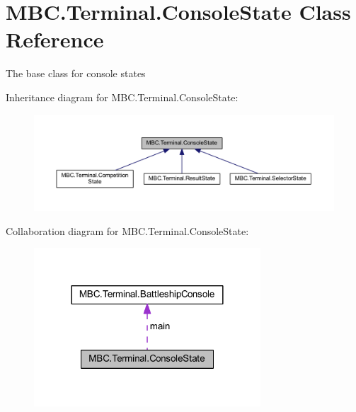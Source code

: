 \hypertarget{class_m_b_c_1_1_terminal_1_1_console_state}{\section{M\-B\-C.\-Terminal.\-Console\-State Class Reference}
\label{class_m_b_c_1_1_terminal_1_1_console_state}
}


The base class for console states 




Inheritance diagram for M\-B\-C.\-Terminal.\-Console\-State\-:\nopagebreak
\begin{figure}[H]
\begin{center}
\leavevmode
\includegraphics[width=350pt]{class_m_b_c_1_1_terminal_1_1_console_state__inherit__graph}
\end{center}
\end{figure}


Collaboration diagram for M\-B\-C.\-Terminal.\-Console\-State\-:\nopagebreak
\begin{figure}[H]
\begin{center}
\leavevmode
\includegraphics[width=240pt]{class_m_b_c_1_1_terminal_1_1_console_state__coll__graph}
\end{center}
\end{figure}
